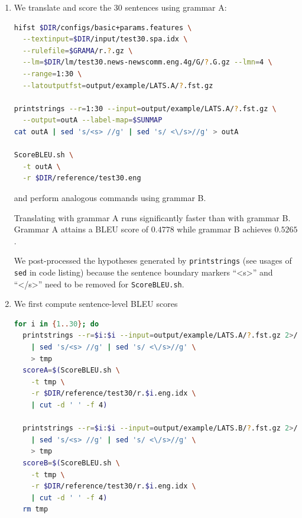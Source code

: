 \documentclass[a4paper,oneside,reqno]{amsart}
\begin{document}
\begin{enumerate}[label=\arabic*.]
  \item
    We translate and score the 30 sentences using grammar A:
    \begin{lstlisting}[language=bash]
hifst $DIR/configs/basic+params.features \
  --textinput=$DIR/input/test30.spa.idx \
  --rulefile=$GRAMA/r.?.gz \
  --lm=$DIR/lm/test30.news-newscomm.eng.4g/G/?.G.gz --lmn=4 \
  --range=1:30 \
  --latoutputfst=output/example/LATS.A/?.fst.gz

printstrings --r=1:30 --input=output/example/LATS.A/?.fst.gz \
  --output=outA --label-map=$SUNMAP
cat outA | sed 's/<s> //g' | sed 's/ <\/s>//g' > outA

ScoreBLEU.sh \
  -t outA \
  -r $DIR/reference/test30.eng
    \end{lstlisting}
    and perform analogous commands using grammar B.

    Translating with grammar A runs significantly faster than with
    grammar B. Grammar A attains a BLEU score of $0.4778$ while grammar B
    achieves $0.5265$.

    We post-processed the hypotheses generated by \texttt{printstrings} (see
    usages of \texttt{sed} in code listing) because the sentence boundary
    markers ``<s>'' and ``</s>'' need to be removed for \texttt{ScoreBLEU.sh}.

  \item We first compute sentence-level BLEU scores
    \begin{lstlisting}[language=bash]
for i in {1..30}; do
  printstrings --r=$i:$i --input=output/example/LATS.A/?.fst.gz 2>/dev/null \
    | sed 's/<s> //g' | sed 's/ <\/s>//g' \
    > tmp
  scoreA=$(ScoreBLEU.sh \
    -t tmp \
    -r $DIR/reference/test30/r.$i.eng.idx \
    | cut -d ' ' -f 4)

  printstrings --r=$i:$i --input=output/example/LATS.B/?.fst.gz 2>/dev/null \
    | sed 's/<s> //g' | sed 's/ <\/s>//g' \
    > tmp
  scoreB=$(ScoreBLEU.sh \
    -t tmp \
    -r $DIR/reference/test30/r.$i.eng.idx \
    | cut -d ' ' -f 4)
  rm tmp


\end{lstlisting}
\end{enumerate}
\end{document}
